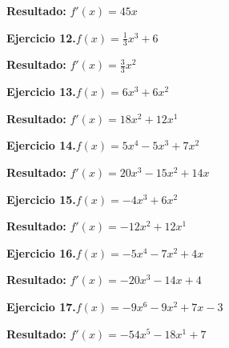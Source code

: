 \documentclass[10pt,a4paper]{article}
\begin{document}
\begin{solbox}
\textbf{Resultado:} \(\displaystyle f'(x) = 45x\)
\end{solbox}

\begin{ejbox}
\textbf{Ejercicio 12.}\quad $f(x) = \frac{1}{3}x^{3} +6$
\end{ejbox}

\begin{solbox}
\textbf{Resultado:} \(\displaystyle f'(x) = \frac{3}{3}x^{2}\)
\end{solbox}

\newpage
\begin{ejbox}
\textbf{Ejercicio 13.}\quad $f(x) = 6x^{3} +6x^{2}$
\end{ejbox}

\begin{solbox}
\textbf{Resultado:} \(\displaystyle f'(x) = 18x^{2} +12x^{1}\)
\end{solbox}

\begin{ejbox}
\textbf{Ejercicio 14.}\quad $f(x) = 5x^4 -5x^3 +7x^2$
\end{ejbox}

\begin{solbox}
\textbf{Resultado:} \(\displaystyle f'(x) = 20x^3 -15x^2 +14x\)
\end{solbox}

\begin{ejbox}
\textbf{Ejercicio 15.}\quad $f(x) = -4x^{3} +6x^{2}$
\end{ejbox}

\begin{solbox}
\textbf{Resultado:} \(\displaystyle f'(x) = -12x^{2} +12x^{1}\)
\end{solbox}

\newpage
\begin{ejbox}
\textbf{Ejercicio 16.}\quad $f(x) = -5x^{4} -7x^2 +4x$
\end{ejbox}

\begin{solbox}
\textbf{Resultado:} \(\displaystyle f'(x) = -20x^{3} -14x +4\)
\end{solbox}

\begin{ejbox}
\textbf{Ejercicio 17.}\quad $f(x) = -9x^{6} -9x^{2} +7x -3$
\end{ejbox}

\begin{solbox}
\textbf{Resultado:} \(\displaystyle f'(x) = -54x^{5} -18x^{1} +7\)
\end{solbox}
\end{document}

